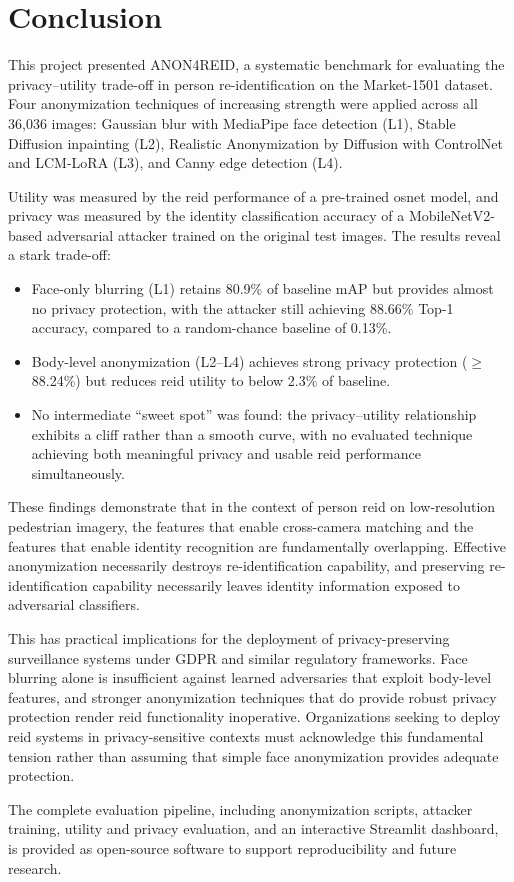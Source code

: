 \chapter{Conclusion}

This project presented ANON4REID, a systematic benchmark for evaluating the privacy--utility trade-off in person re-identification on the Market-1501 dataset. Four anonymization techniques of increasing strength were applied across all 36,036 images: Gaussian blur with MediaPipe face detection (L1), Stable Diffusion inpainting (L2), Realistic Anonymization by Diffusion with ControlNet and LCM-LoRA (L3), and Canny edge detection (L4).

Utility was measured by the \acrshort{reid} performance of a pre-trained \acrshort{osnet} model, and privacy was measured by the identity classification accuracy of a MobileNetV2-based adversarial attacker trained on the original test images. The results reveal a stark trade-off:

\begin{keybox}
\begin{itemize}[noitemsep]
    \item Face-only blurring (L1) retains 80.9\% of baseline mAP but provides almost no privacy protection, with the attacker still achieving 88.66\% Top-1 accuracy, compared to a random-chance baseline of 0.13\%.
    \item Body-level anonymization (L2--L4) achieves strong privacy protection ($\geq$88.24\%) but reduces \acrshort{reid} utility to below 2.3\% of baseline.
    \item No intermediate ``sweet spot'' was found: the privacy--utility relationship exhibits a cliff rather than a smooth curve, with no evaluated technique achieving both meaningful privacy and usable \acrshort{reid} performance simultaneously.
\end{itemize}
\end{keybox}

These findings demonstrate that in the context of person \acrshort{reid} on low-resolution pedestrian imagery, the features that enable cross-camera matching and the features that enable identity recognition are fundamentally overlapping. Effective anonymization necessarily destroys re-identification capability, and preserving re-identification capability necessarily leaves identity information exposed to adversarial classifiers.

This has practical implications for the deployment of privacy-preserving surveillance systems under GDPR and similar regulatory frameworks. Face blurring alone is insufficient against learned adversaries that exploit body-level features, and stronger anonymization techniques that do provide robust privacy protection render \acrshort{reid} functionality inoperative. Organizations seeking to deploy \acrshort{reid} systems in privacy-sensitive contexts must acknowledge this fundamental tension rather than assuming that simple face anonymization provides adequate protection.

The complete evaluation pipeline, including anonymization scripts, attacker training, utility and privacy evaluation, and an interactive Streamlit dashboard, is provided as open-source software to support reproducibility and future research.
